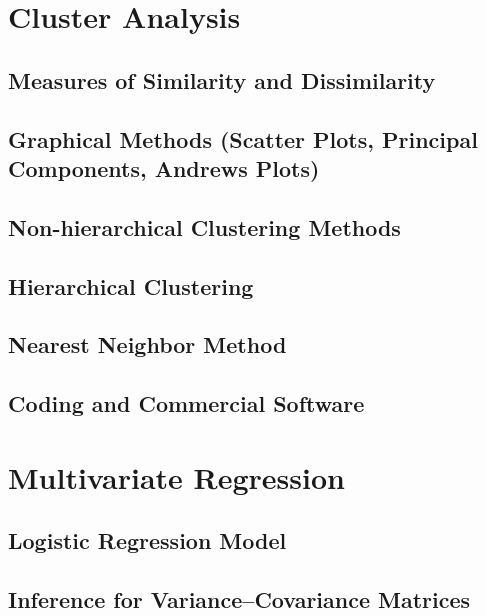 \documentclass[12pt]{book}
\theoremstyle{definition}
\theoremstyle{remark}
\begin{document}
\chapter{Cluster Analysis}

\section{Measures of Similarity and Dissimilarity}

\section{Graphical Methods (Scatter Plots, Principal Components, Andrews Plots)}

\section{Non-hierarchical Clustering Methods}

\section{Hierarchical Clustering}

\section{Nearest Neighbor Method}

\section{Coding and Commercial Software}

\chapter{Multivariate Regression}

\section{Logistic Regression Model}

\section{Inference for Variance–Covariance Matrices}
\end{document}
